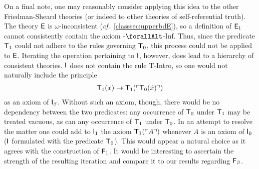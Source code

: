 \documentclass[UKenglish,cleveref,DIV=12]{scrartcl}
\let\forall\forallAlt
\theoremstyle{definition}
\theoremstyle{definition}
\begin{document}
 On a final note, one may
reasonably consider applying this idea to the other Friedman-Sheard
theories (or indeed to other theories of self-referential truth). The
theory $\mathsf{E}$ is $\omega$-inconsistent ({\em cf.}~\cref{classsec:upperbdE}),
so a definition of $\mathsf{E}_1$ cannot consistently contain the axiom
-$\forall$-Inf. Thus, since the predicate $\mathsf{T}_1$ could not adhere to the
rules governing $\mathsf{T}_0$, this process could not be applied to $\mathsf{E}$. Iterating the
operation pertaining to $\mathsf{I}$, however, does lead to a hierarchy of consistent
theories. $\mathsf{I}$ does not contain the rule T-Intro, so one would not naturally include the principle
\begin{align*}
  \mathsf{T}_1(x)\rightarrow \mathsf{T}_1(\ulcorner{\mathsf{T}_0(\dot x)}\urcorner)
\end{align*}
as an axiom of $\mathsf{I}_\beta$. Without such an axiom, though, there would be no dependency between the two
predicates: any occurrence of $\mathsf{T}_0$ under $\mathsf{T}_1$ may be treated vacuous, as can
any occurrence of $\mathsf{T}_1$ under $\mathsf{T}_0$. In an attempt to resolve the matter one
could add to $\mathsf{I}_1$ the axiom $\mathsf{T}_1(\ulcorner{A}\urcorner)$ whenever $A$ is an axiom of $\mathsf{I}_0$
($\mathsf{I}$ formulated with the predicate $\mathsf{T}_0$). This would appear a natural choice
as it agrees with the construction of $\mathsf{F}_1$.
It would be interesting to ascertain the strength of the resulting
iteration and compare it to our results regarding $\mathsf{F}_\beta$.

\end{document}

